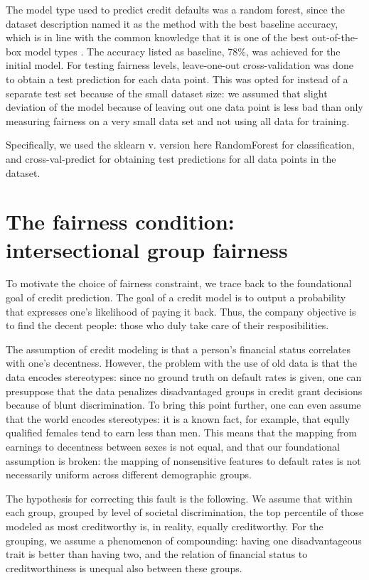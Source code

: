 \documentclass{article}
\begin{document}
The model type used to predict credit defaults was a random forest, since the 
dataset description named it as the method with the best baseline accuracy, which 
is in line with the common knowledge that it is one of the best out-of-the-box model types \cite{stanley}.
The accuracy listed as baseline, 78\%, was achieved for the initial model.
For testing fairness levels, leave-one-out cross-validation was done to obtain 
a test prediction for each data point. This was opted for instead of a separate test set 
because of the small dataset size: we assumed that slight deviation of the model because of leaving out one data point 
is less bad than only measuring fairness on a very small data set and not using all data for training.

Specifically, we used the sklearn v. version here RandomForest \cite{stanley} for classification, 
and cross-val-predict for obtaining test predictions for all data points in 
the dataset.

\section*{The fairness condition: intersectional group fairness}

To motivate the choice of fairness constraint, we trace back to the foundational goal 
of credit prediction. The goal of a credit model is to output a probability that 
expresses one's likelihood of paying it back. Thus, the company objective is to find 
the decent people: those who duly take care of their resposibilities.

The assumption of credit modeling is that a person's financial status 
correlates with one's decentness. However, the problem with the use of old data 
is that the data encodes stereotypes: since no ground truth on default rates is given,
one can presuppose that the data penalizes disadvantaged groups in credit grant decisions because of blunt discrimination.
To bring this point further, one can even assume that the world encodes stereotypes:
it is a known fact, for example, that eqully qualified females tend to earn less 
than men. This means that the mapping from earnings to decentness between sexes is not equal, 
and that our foundational assumption is broken: the mapping of nonsensitive features to 
default rates is not necessarily uniform across different demographic groups.

The hypothesis for correcting this fault is the following. We assume that 
within each group, grouped by level of societal discrimination, the top percentile of those modeled as 
most creditworthy is, in reality, equally creditworthy. For the grouping, we assume 
a phenomenon of compounding: having one disadvantageous trait is better than having two, 
and the relation of financial status to creditworthiness is unequal also between these groups.
\end{document}
